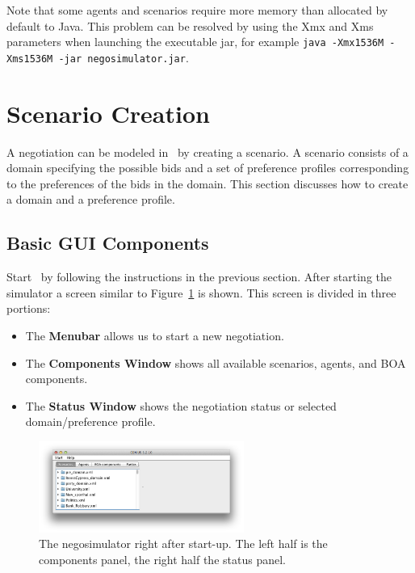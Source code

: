 \documentclass[]{article}
\begin{document}
Note that some agents and scenarios require more memory than allocated by default to Java. This problem can be resolved by using the Xmx and Xms parameters when launching the executable jar, for example \texttt{java -Xmx1536M -Xms1536M -jar negosimulator.jar}.


\section{Scenario Creation}
A negotiation can be modeled in \Genius~by creating a scenario. A scenario consists of a domain specifying the possible bids and a set of preference profiles corresponding to the preferences of the bids in the domain. This section discusses how to create a domain and a preference profile.

\subsection{Basic GUI Components}
Start \Genius~by following the instructions in the previous section. After starting the simulator a screen similar to Figure~\ref{Fig:negosimulator start} is shown. This screen is divided in three portions:

\begin{itemize}
	\item The \textbf{Menubar} allows us to start a new negotiation.
	\item The \textbf{Components Window} shows all available scenarios, agents, and BOA components.
	\item The \textbf{Status Window} shows the negotiation status or selected domain/preference profile.
\end{itemize}

\begin{figure}[htb]
	\centering
	\includegraphics[width=0.6\textwidth]{media/start.png}
\caption{The negosimulator right after start-up. The left half is the components panel, the right half the status panel.}\label{Fig:negosimulator start}
\end{figure}
\end{document}
